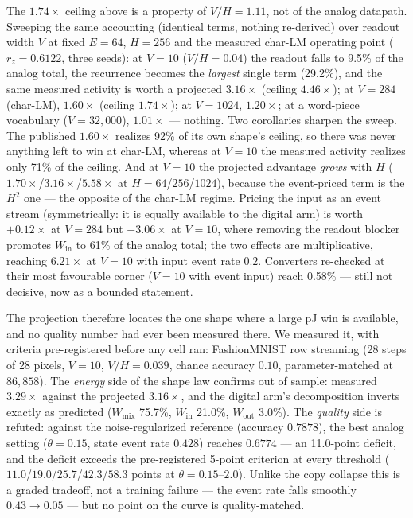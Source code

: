 The $1.74\times$ ceiling above is a property of $V/H = 1.11$, not of the analog datapath.
Sweeping the same accounting (identical terms, nothing re-derived) over readout width $V$
at fixed $E{=}64$, $H{=}256$ and the measured char-LM operating point ($r_z = 0.6122$,
three seeds): at $V{=}10$ ($V/H = 0.04$) the readout falls to 9.5\% of the analog total,
the recurrence becomes the \emph{largest} single term (29.2\%), and the same measured
activity is worth a projected $3.16\times$ (ceiling $4.46\times$); at $V{=}284$ (char-LM),
$1.60\times$ (ceiling $1.74\times$); at $V{=}1024$, $1.20\times$; at a word-piece
vocabulary ($V{=}32{,}000$), $1.01\times$ --- nothing. Two corollaries sharpen the sweep.
The published $1.60\times$ realizes 92\% of its own shape's ceiling, so there was never
anything left to win at char-LM, whereas at $V{=}10$ the measured activity realizes only
71\% of the ceiling. And at $V{=}10$ the projected advantage \emph{grows} with $H$
($1.70\times$/$3.16\times$/$5.58\times$ at $H{=}64$/$256$/$1024$), because the
event-priced term is the $H^{2}$ one --- the opposite of the char-LM regime. Pricing the
input as an event stream (symmetrically: it is equally available to the digital arm) is
worth $+0.12\times$ at $V{=}284$ but $+3.06\times$ at $V{=}10$, where removing the readout
blocker promotes $W_{\mathrm{in}}$ to 61\% of the analog total; the two effects are
multiplicative, reaching $6.21\times$ at $V{=}10$ with input event rate $0.2$. Converters
re-checked at their most favourable corner ($V{=}10$ with event input) reach 0.58\% ---
still not decisive, now as a bounded statement.

The projection therefore locates the one shape where a large pJ win is available, and no
quality number had ever been measured there. We measured it, with criteria pre-registered
before any cell ran: FashionMNIST row streaming (28 steps of 28 pixels, $V{=}10$,
$V/H = 0.039$, chance accuracy $0.10$, parameter-matched at $86{,}858$). The
\emph{energy} side of the shape law confirms out of sample: measured $3.29\times$ against
the projected $3.16\times$, and the digital arm's decomposition inverts exactly as
predicted ($W_{\mathrm{mix}}$ 75.7\%, $W_{\mathrm{in}}$ 21.0\%, $W_{\mathrm{out}}$ 3.0\%).
The \emph{quality} side is refuted: against the noise-regularized reference (accuracy
$0.7878$), the best analog setting ($\theta{=}0.15$, state event rate $0.428$) reaches
$0.6774$ --- an 11.0-point deficit, and the deficit exceeds the pre-registered 5-point
criterion at every threshold ($11.0$/$19.0$/$25.7$/$42.3$/$58.3$ points at
$\theta = 0.15$--$2.0$). Unlike the copy collapse this is a graded tradeoff, not a
training failure --- the event rate falls smoothly $0.43 \to 0.05$ --- but no point on
the curve is quality-matched.

